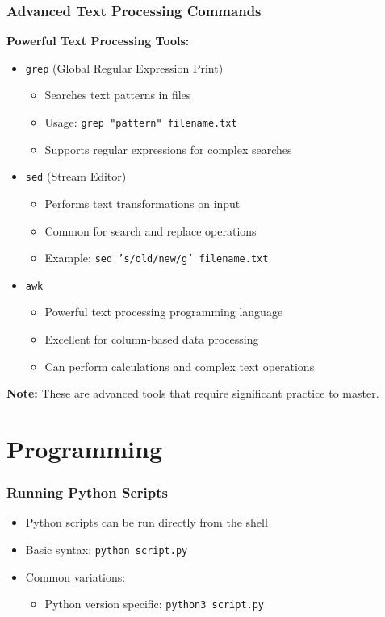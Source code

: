 \documentclass[10pt]{beamer}
\begin{document}
\begin{frame}[fragile]
    \frametitle{Advanced Text Processing Commands}
    
    \textbf{Powerful Text Processing Tools:}
    \begin{itemize}
        \item \colorbox{gray!20}{\texttt{grep}} (Global Regular Expression Print)
        \begin{itemize}
            \item Searches text patterns in files
            \item Usage: \texttt{grep "pattern" filename.txt}
            \item Supports regular expressions for complex searches
        \end{itemize}
        
        \item \colorbox{gray!20}{\texttt{sed}} (Stream Editor)
        \begin{itemize}
            \item Performs text transformations on input
            \item Common for search and replace operations
            \item Example: \texttt{sed 's/old/new/g' filename.txt}
        \end{itemize}
        
        \item \colorbox{gray!20}{\texttt{awk}}
        \begin{itemize}
            \item Powerful text processing programming language
            \item Excellent for column-based data processing
            \item Can perform calculations and complex text operations
        \end{itemize}
    \end{itemize}
    
    \vspace{0.5em}
    \textbf{Note:} These are advanced tools that require significant practice to master.
\end{frame}

\section{Programming}

\begin{frame}[fragile]
    \frametitle{Running Python Scripts}
    \begin{itemize}
        \item Python scripts can be run directly from the shell
        \item Basic syntax: \colorbox{gray!20}{\texttt{python script.py}}
        \item Common variations:
        \begin{itemize}
            \item Python version specific: \colorbox{gray!20}{\texttt{python3 script.py}}
        \end{itemize}
    \end{itemize}
\end{frame}
\end{document}
